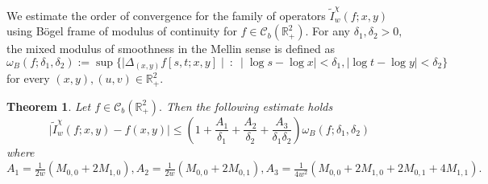 \documentclass[12pt]{article}
\newtheorem{thm}{Theorem}[section]
\begin{document}
{We estimate the order of convergence for the family of operators $\tilde{I}_w^{\chi}(f;x,y)$ using B\"{o}gel frame of modulus of continuity for $f\in \mathcal{C}_{b}(\mathbb{R}^{2}_{+}).$ For any $\delta_1,\delta_2 > 0 ,$ the mixed modulus of smoothness in the Mellin sense is defined as
$$\omega_{B}(f;\delta_1,\delta_2):=\sup\{\mid\Delta_{(x,y)}f[s,t;x,y]\mid \ : \ \mid \log s - \log x \mid <\delta_1, \mid \log t - \log y \mid <\delta_2\}$$ for every $(x,y), (u,v)\in\mathbb{R}^{2}_{+}.$
\begin{thm}\label{t3}
Let $f\in \mathcal{C}_{b}(\mathbb{R}^{2}_{+}).$ Then the following estimate holds
$$ \mid \tilde{I}^{\chi}_{w}(f;x,y)-f(x,y)\mid \leq \left(1+\frac{A_{1}}{\delta_{1}}+\frac{A_{2}}{\delta_{2}}+\frac{A_{3}}{\delta_{1}\delta_{2}}\right)\omega_{B}\left(f;\delta_{1},\delta_{2}\right)$$
where $A_{1}=\frac{1}{2w}\left(M_{0,0}+2M_{1,0}\right), A_{2}=\frac{1}{2w}\left(M_{0,0}+2M_{0,1}\right), A_{3}=\frac{1}{4w^2}\left(M_{0,0}+2M_{1,0}+2M_{0,1}+4M_{1,1}\right).$
\end{thm}

}
\end{document}
